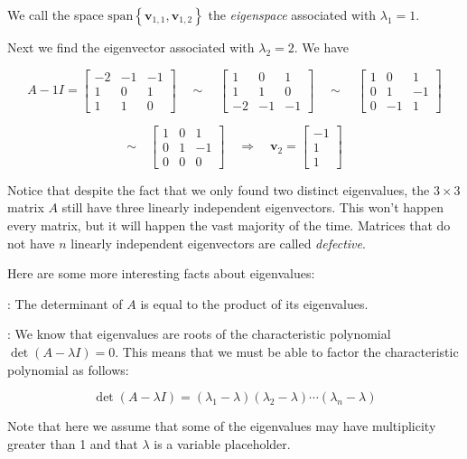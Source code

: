 \documentclass[12pt]{article}
\newcommand{\nin}{\noindent}
\newcommand{\vthree}{\vspace{3mm}}
\newcommand{\myp}[1]{\left( #1 \right)}
\newcommand{\mys}[1]{\left\{ #1 \right\}}
\newcommand{\mymat}[1]{
\left[
\begin{array}{rrrrrrrrrrrrrrrrrrrrrrrrrrrrrrrrrrrrrrr}
#1
\end{array}
\right]
}
\newcommand{\bv}{\mathbf{v}}
\begin{document}
\vthree

\nin We call the space $\textrm{span}\mys{\bv_{1,1}, \bv_{1,2}}$ the {\it eigenspace} associated with $\lambda_1 = 1$.

\vthree

\nin Next we find the eigenvector associated with $\lambda_2 = 2$.  We have

\[
A - 1I =
\mymat{
-2 & -1 & -1 \\
1 & 0 & 1 \\
1 & 1 & 0
}
\quad \sim \quad
\mymat{
1 & 0 & 1 \\
1 & 1 & 0 \\
-2 & -1 & -1
}
\quad \sim \quad
\mymat{
1 & 0 & 1 \\
0 & 1 & -1 \\
0 & -1 & 1
}
\]

\[
\sim \quad
\mymat{
1 & 0 & 1 \\
0 & 1 & -1 \\
0 & 0 & 0
}
\quad \Rightarrow \quad \bv_2 = \mymat{-1 \\ 1 \\ 1}
\]

\vthree

\nin Notice that despite the fact that we only found two distinct eigenvalues, the $3 \times 3$ matrix $A$ still have three linearly independent eigenvectors.  This won't happen every matrix, but it will happen the vast majority of the time.  Matrices that do not have $n$ linearly independent eigenvectors are called {\it defective}.

\vthree

\nin Here are some more interesting facts about eigenvalues:

\vthree

\nin {\bf Fact 1}: The determinant of $A$ is equal to the product of its eigenvalues.

\vthree

\nin {\bf Proof}: We know that eigenvalues are roots of the characteristic polynomial $\det\myp{A - \lambda I} = 0$.  This means that we must be able to factor the characteristic polynomial as follows:

\[
\det\myp{A - \lambda I} = \myp{\lambda_1 - \lambda}\myp{\lambda_2 - \lambda} \cdots \myp{\lambda_n - \lambda}
\]

\vthree

\nin Note that here we assume that some of the eigenvalues may have multiplicity greater than 1 and that $\lambda$ is a variable placeholder.
\end{document}
